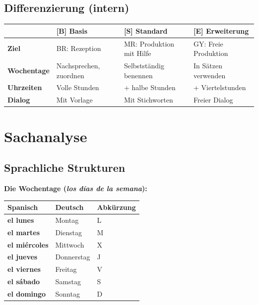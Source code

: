 \documentclass[11pt,a4paper]{article}
\newcommand{\B}{\textcolor{basis}{\textbf{[B]}}}
\newcommand{\Std}{\textcolor{standard}{\textbf{[S]}}}
\newcommand{\E}{\textcolor{erweiterung}{\textbf{[E]}}}
\begin{document}
\subsection{Differenzierung (intern)}
\begin{tabular}{|l|p{3.5cm}|p{3.5cm}|p{3.5cm}|}
\hline
& \B{} \textbf{Basis} & \Std{} \textbf{Standard} & \E{} \textbf{Erweiterung} \\
\hline
\textbf{Ziel} & BR: Rezeption & MR: Produktion mit Hilfe & GY: Freie Produktion \\
\hline
\textbf{Wochentage} & Nachsprechen, zuordnen & Selbstständig benennen & In Sätzen verwenden \\
\hline
\textbf{Uhrzeiten} & Volle Stunden & + halbe Stunden & + Viertelstunden \\
\hline
\textbf{Dialog} & Mit Vorlage & Mit Stichworten & Freier Dialog \\
\hline
\end{tabular}

\section{Sachanalyse}

\subsection{Sprachliche Strukturen}

\textbf{Die Wochentage (\textit{los días de la semana}):}
\begin{center}
\begin{tabular}{|l|l|l|}
\hline
\textbf{Spanisch} & \textbf{Deutsch} & \textbf{Abkürzung} \\
\hline
\textbf{el lunes} & Montag & L \\
\textbf{el martes} & Dienstag & M \\
\textbf{el miércoles} & Mittwoch & X \\
\textbf{el jueves} & Donnerstag & J \\
\textbf{el viernes} & Freitag & V \\
\textbf{el sábado} & Samstag & S \\
\textbf{el domingo} & Sonntag & D \\
\hline
\end{tabular}
\end{center}
\end{document}
